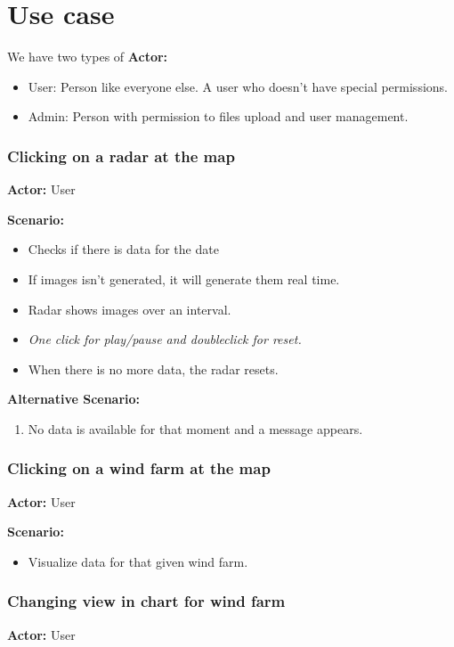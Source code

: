 \chapter{Use case}
We have two types of \textbf{Actor:}
\begin{itemize}
\item User: Person like everyone else. A user who doesn't have special permissions.
\item Admin: Person with permission to files upload and user management.
\end{itemize}

\subsection{Clicking on a radar at the map}
\textbf{Actor:} User

\textbf{Scenario:}
\begin{itemize}
\item Checks if there is data for the date
\item If images isn't generated, it will generate them real time.
\item Radar shows images over an interval.
\item \emph{One click for play/pause and doubleclick for reset.}
\item When there is no more data, the radar resets.
\end{itemize}
\textbf{Alternative Scenario:} 
\begin{enumerate}
\item No data is available for that moment and a message appears.
\end{enumerate}

\subsection{Clicking on a wind farm at the map}
\textbf{Actor:} User

\textbf{Scenario:}
\begin{itemize}
\item Visualize data for that given wind farm.
\end{itemize}

\subsection{Changing view in chart for wind farm}
\textbf{Actor:} User

